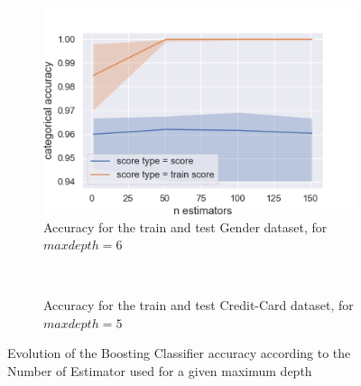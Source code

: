 \documentclass[10pt]{article}
\begin{document}
		\paragraph*{}
			\begin{figure}[h]
				\centering
				\begin{subfigure}[]{0.45\columnwidth}
					\centering
					\includegraphics[width=\linewidth]{../graphics/boost_gender_n_estimators_score_type_score_type.png}
					\caption{Accuracy for the train and test Gender dataset, for $maxdepth=6$}
					\label{boost_sc_train_vs_test_es}
				\end{subfigure}
				~
				\begin{subfigure}[]{0.45\columnwidth}
					\centering
					\caption{Accuracy for the train and test Credit-Card dataset, for $maxdepth=5$}
					\label{boost_cc_train_vs_test_es}
				\end{subfigure}
				\caption{Evolution of the Boosting Classifier accuracy according to the Number of Estimator used for a given maximum depth}
				\label{boost_train_vs_test_es}
			\end{figure}
\end{document}
